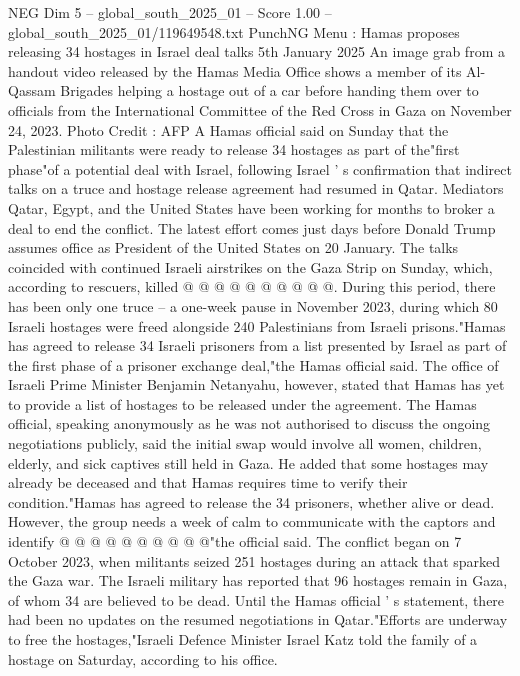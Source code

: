 \begin{textsample}{NEG Dim 5 – global\_south\_2025\_01 – Score 1.00 – global\_south\_2025\_01/119649548.txt}  \label{ex:f5_neg_157}
PunchNG Menu : Hamas proposes releasing 34 hostages in Israel deal talks 5th January 2025 An image grab from a handout video released by the Hamas Media Office shows a member of its Al-Qassam Brigades helping a hostage out of a car before handing them over to officials from the International Committee of the Red Cross in Gaza on November 24, 2023.
Photo Credit : AFP A Hamas official said on Sunday that the Palestinian militants were ready to release 34 hostages as part of the"first phase"of a potential deal with Israel, following Israel ' s confirmation that indirect talks on a truce and hostage release agreement had resumed in Qatar.
Mediators Qatar, Egypt, and the United States have been working for months to broker a deal to end the conflict.
The latest effort comes just days before Donald Trump assumes office as President of the United States on 20 January.
The talks coincided with continued Israeli airstrikes on the Gaza Strip on Sunday, which, according to rescuers, killed @ @ @ @ @ @ @ @ @ @.
During this period, there has been only one truce -- a one-week pause in November 2023, during which 80 Israeli hostages were freed alongside 240 Palestinians from Israeli prisons."Hamas has agreed to release 34 Israeli prisoners from a list presented by Israel as part of the first phase of a prisoner exchange deal,"the Hamas official said.
The office of Israeli Prime Minister Benjamin Netanyahu, however, stated that Hamas has yet to provide a list of hostages to be released under the agreement.
The Hamas official, speaking anonymously as he was not authorised to discuss the ongoing negotiations publicly, said the initial swap would involve all women, children, elderly, and sick captives still held in Gaza.
He added that some hostages may already be deceased and that Hamas requires time to verify their condition."Hamas has agreed to release the 34 prisoners, whether alive or dead.
However, the group needs a week of calm to communicate with the captors and identify @ @ @ @ @ @ @ @ @ @"the official said.
The conflict began on 7 October 2023, when militants seized 251 hostages during an attack that sparked the Gaza war.
The Israeli military has reported that 96 hostages remain in Gaza, of whom 34 are believed to be dead.
Until the Hamas official ' s statement, there had been no updates on the resumed negotiations in Qatar."Efforts are underway to free the hostages,"Israeli Defence Minister Israel Katz told the family of a hostage on Saturday, according to his office.

\end{textsample}

